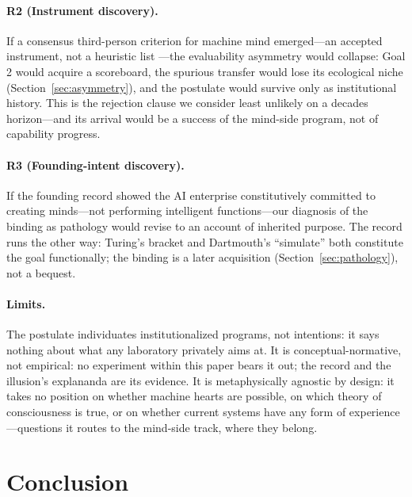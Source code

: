 \documentclass[10pt]{article}
\begin{document}
\paragraph{R2 (Instrument discovery).} If a consensus third-person criterion for machine mind emerged---an accepted instrument, not a heuristic list \cite{butlin2023consciousness}---the evaluability asymmetry would collapse: Goal 2 would acquire a scoreboard, the spurious transfer would lose its ecological niche (Section~\ref{sec:asymmetry}), and the postulate would survive only as institutional history. This is the rejection clause we consider least unlikely on a decades horizon---and its arrival would be a success of the mind-side program, not of capability progress.

\paragraph{R3 (Founding-intent discovery).} If the founding record showed the AI enterprise constitutively committed to creating minds---not performing intelligent functions---our diagnosis of the binding as pathology would revise to an account of inherited purpose. The record runs the other way: Turing's bracket \cite{turing1950} and Dartmouth's ``simulate'' \cite{mccarthy1955proposal} both constitute the goal functionally; the binding is a later acquisition (Section~\ref{sec:pathology}), not a bequest.

\paragraph{Limits.} The postulate individuates institutionalized programs, not intentions: it says nothing about what any laboratory privately aims at. It is conceptual-normative, not empirical: no experiment within this paper bears it out; the record and the illusion's explananda are its evidence. It is metaphysically agnostic by design: it takes no position on whether machine hearts are possible, on which theory of consciousness is true, or on whether current systems have any form of experience---questions it routes to the mind-side track, where they belong.

\section{Conclusion}\label{sec:conclusion}
\end{document}
